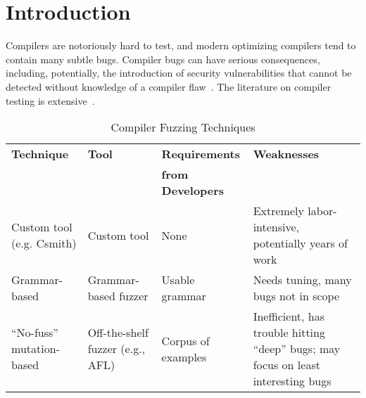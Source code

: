 \section{Introduction}

Compilers are notoriously hard to test, and modern optimizing
compilers tend to contain many subtle bugs.  Compiler bugs can have
serious consequences, including, potentially, the introduction of
security vulnerabilities that cannot be detected without knowledge of a compiler flaw~\cite{CompBug}.   The
literature on compiler testing is extensive~\cite{chen2020survey}.

\small
\begin{table*}
\centering
\begin{tabular}{p{35mm}p{31mm}p{30mm}p{67mm}}
\toprule
\bf Technique & \bf Tool & \bf Requirements    & \bf Weaknesses \\
              &          & \bf from Developers &                \\
\rowcolor{LLGray}
Custom tool (e.g. Csmith)  
& Custom tool 
& None 
& Extremely labor-intensive, potentially years of work
\\
Grammar-based              
& Grammar-based fuzzer             
& Usable grammar 
& Needs tuning, many bugs not in scope 
\\
\rowcolor{LLGray}
``No-fuss'' mutation-based 
& Off-the-shelf fuzzer \newline (e.g., AFL) 
& Corpus of examples 
& Inefficient, has trouble hitting ``deep'' bugs; may focus on
                        least interesting bugs
  \\
\bottomrule
\end{tabular}
\caption{Compiler Fuzzing Techniques}
\label{tab:techniques}
\end{table*}
\normalsize


